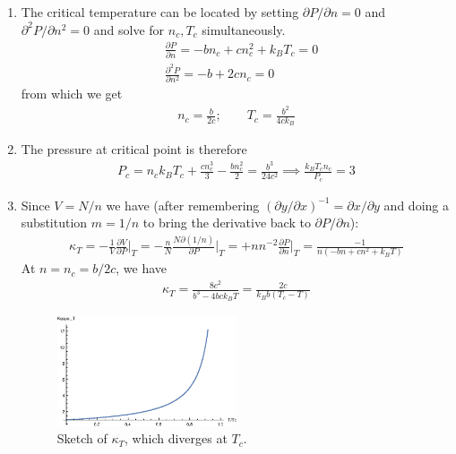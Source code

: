 \documentclass{article}
\theoremstyle{definition}
\newcommand{\p}{\partial}
\newcommand{\f}[2]{\frac{#1}{#2}}
\begin{document}
\begin{enumerate}[label=(\alph*)]
	
	\item The critical temperature can be located by setting $\p P / \p n = 0$ and $\p^2 P /\p n^2 = 0$ and solve for $n_c, T_c$ simultaneously. 
	\begin{align*}
	&\f{\p P}{\p n} = -bn_c + cn_c^2 + k_BT_c = 0 \\
	&\f{\p^2 P}{\p n^2} = -b + 2cn_c = 0
	\end{align*}
	from which we get
	\begin{align*}
	\boxed{n_c = \f{b}{2c}; \quad\quad T_c = \f{b^2}{4ck_B}}
	\end{align*}
	\item 
	The pressure at critical point is therefore
	\begin{align*}
	P_c = n_ck_BT_c + \f{cn_c^3}{3} - \f{b n_c^2}{2} = \boxed{\f{b^3}{24c^2}} \implies \boxed{\f{k_B T_c n_c}{P_c} = 3 }
	\end{align*}
	\item Since $V = N/n$ we have (after remembering $(\p y/\p x)^{-1} = \p x/\p y$ and doing a substitution $m =1/n$ to bring the derivative back to $\p P / \p n$):
	\begin{align*}
	\kappa_T = -\f{1}{V}\f{\p V}{\p P}\bigg\vert_T = -\f{n}{N}\f{N\p (1/n)}{\p P}\bigg\vert_T = +n n^{-2}\f{\p P}{\p n}\bigg\vert_T = \boxed{\f{-1}{n(-bn + cn^2 + k_BT)}}
	\end{align*}
	At $n = n_c = b/2c$, we have
	\begin{align*}
	\kappa_T = \f{8c^2}{b^3 - 4bc k_B T} = \boxed{\f{2c}{k_Bb(T_c-T)}}
	\end{align*} 
	\begin{figure}[!htb]
		\centering
		\includegraphics[width=0.5\textwidth]{sketch}
		\caption{Sketch of $\kappa_T$, which diverges at $T_c$.}
	\end{figure}



\end{enumerate}
\end{document}
